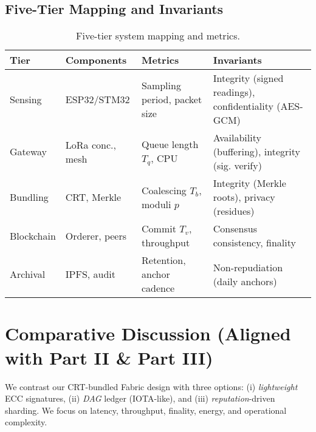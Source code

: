 \documentclass[12pt,onecolumn]{IEEEtran} %
\begin{document}
\subsection{Five-Tier Mapping and Invariants}
\begingroup
\setlength{\tabcolsep}{4pt}\footnotesize
\begin{table}[ht]
  \centering
  \caption{Five-tier system mapping and metrics.}
  \label{tab:tier-map}
  \begin{tabularx}{\textwidth}{l l l X}
    \toprule
    \textbf{Tier} & \textbf{Components} & \textbf{Metrics} & \textbf{Invariants} \\
    \midrule
    Sensing & ESP32/STM32 & Sampling period, packet size & Integrity (signed readings), confidentiality (AES-GCM) \\
    Gateway & LoRa conc., mesh & Queue length \(T_q\), CPU & Availability (buffering), integrity (sig. verify) \\
    Bundling & CRT, Merkle & Coalescing \(T_b\), moduli \(p\) & Integrity (Merkle roots), privacy (residues) \\
    Blockchain & Orderer, peers & Commit \(T_v\), throughput & Consensus consistency, finality \\
    Archival & IPFS, audit & Retention, anchor cadence & Non-repudiation (daily anchors) \\
    \bottomrule
  \end{tabularx}
\end{table}
\endgroup

\section{Comparative Discussion (Aligned with Part II \& Part III)}
\label{sec:comparative-discussion}
We contrast our CRT-bundled Fabric design with three options: (i) \emph{lightweight} ECC signatures, (ii) \emph{DAG} ledger (IOTA-like), and (iii) \emph{reputation}-driven sharding. We focus on latency, throughput, finality, energy, and operational complexity.
\end{document}
